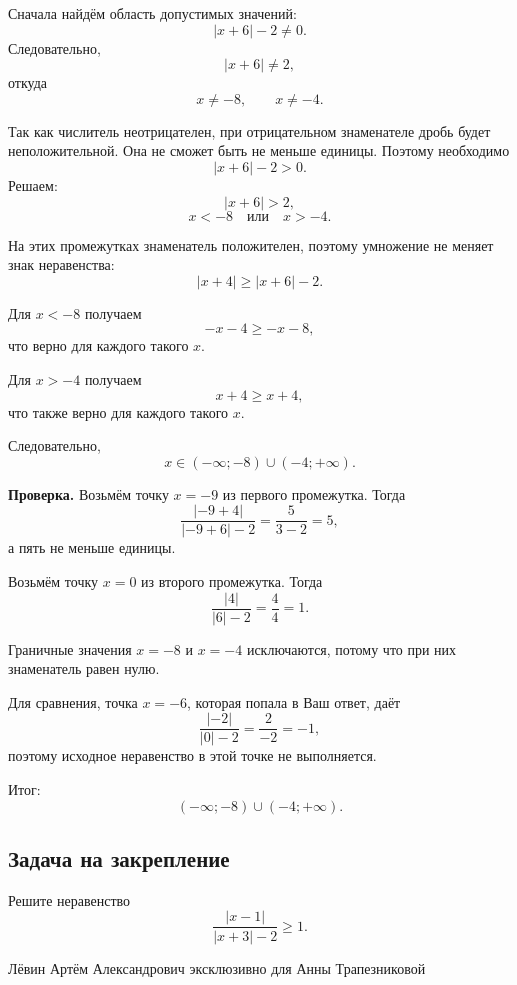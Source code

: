 \documentclass[12pt,a4paper]{article}
\newcommand{\result}{\textcolor{teal!60!black}{Итог:}}
\begin{document}
Сначала найдём область допустимых значений:
\[
|x+6|-2\ne0.
\]
Следовательно,
\[
|x+6|\ne2,
\]
откуда
\[
x\ne-8,
\qquad
x\ne-4.
\]

Так как числитель неотрицателен, при отрицательном знаменателе дробь будет неположительной. Она не сможет быть не меньше единицы. Поэтому необходимо
\[
|x+6|-2>0.
\]
Решаем:
\[
|x+6|>2,
\]
\[
x<-8\quad\text{или}\quad x>-4.
\]

На этих промежутках знаменатель положителен, поэтому умножение не меняет знак неравенства:
\[
|x+4|\ge|x+6|-2.
\]

Для $x<-8$ получаем
\[
-x-4\ge -x-8,
\]
что верно для каждого такого $x$.

Для $x>-4$ получаем
\[
x+4\ge x+4,
\]
что также верно для каждого такого $x$.

Следовательно,
\[
x\in(-\infty;-8)\cup(-4;+\infty).
\]

\textbf{Проверка.}
Возьмём точку $x=-9$ из первого промежутка. Тогда
\[
\frac{|-9+4|}{|-9+6|-2}
=
\frac{5}{3-2}
=5,
\]
а пять не меньше единицы.

Возьмём точку $x=0$ из второго промежутка. Тогда
\[
\frac{|4|}{|6|-2}
=
\frac{4}{4}
=1.
\]

Граничные значения $x=-8$ и $x=-4$ исключаются, потому что при них знаменатель равен нулю.

Для сравнения, точка $x=-6$, которая попала в Ваш ответ, даёт
\[
\frac{|-2|}{|0|-2}
=
\frac{2}{-2}
=-1,
\]
поэтому исходное неравенство в этой точке не выполняется.

\result{}
\[
(-\infty;-8)\cup(-4;+\infty).
\]

\subsection*{Задача на закрепление}
Решите неравенство
\[
\frac{|x-1|}{|x+3|-2}\ge1.
\]

\vfill
\begin{center}
\small Лёвин Артём Александрович эксклюзивно для Анны Трапезниковой
\end{center}
\end{document}
